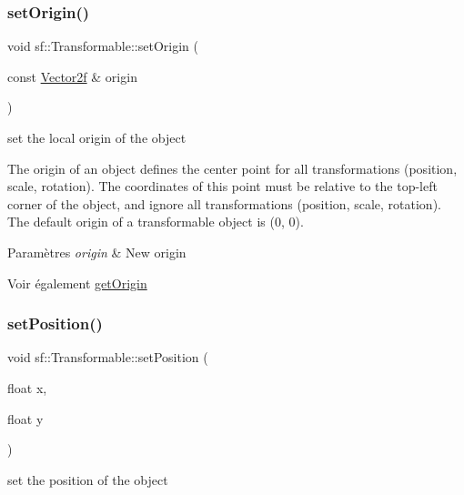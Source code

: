 \subsubsection{\texorpdfstring{set\+Origin()}{setOrigin()}\hspace{0.1cm}{\footnotesize\ttfamily [2/2]}}
{\footnotesize\ttfamily void sf\+::\+Transformable\+::set\+Origin (\begin{DoxyParamCaption}\item[{const \hyperlink{classsf_1_1Vector2}{Vector2f} \&}]{origin }\end{DoxyParamCaption})}



set the local origin of the object 

The origin of an object defines the center point for all transformations (position, scale, rotation). The coordinates of this point must be relative to the top-\/left corner of the object, and ignore all transformations (position, scale, rotation). The default origin of a transformable object is (0, 0).


\begin{DoxyParams}{Paramètres}
{\em origin} & New origin\\
\hline
\end{DoxyParams}
\begin{DoxySeeAlso}{Voir également}
\hyperlink{classsf_1_1Transformable_a37ea3500afac234814a43ce809ef264e}{get\+Origin} 
\end{DoxySeeAlso}
\mbox{\label{classsf_1_1Transformable_a4dbfb1a7c80688b0b4c477d706550208}} 
\subsubsection{\texorpdfstring{set\+Position()}{setPosition()}\hspace{0.1cm}{\footnotesize\ttfamily [1/2]}}
{\footnotesize\ttfamily void sf\+::\+Transformable\+::set\+Position (\begin{DoxyParamCaption}\item[{float}]{x,  }\item[{float}]{y }\end{DoxyParamCaption})}



set the position of the object 

